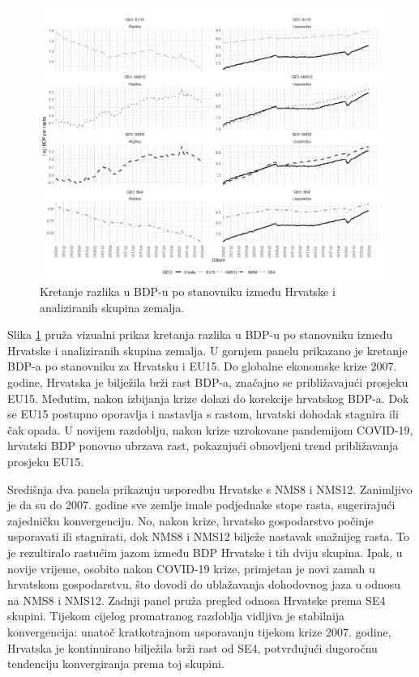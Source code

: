 \documentclass{crebsshr}
\begin{document}
\begin{figure}[ht]
\centering
\includegraphics[width=\linewidth]{Rplot.png} %
\caption{Kretanje razlika u BDP-u po stanovniku između Hrvatske i analiziranih skupina zemalja.}
\label{fig:grafikon1}
\end{figure}

Slika \ref{fig:grafikon1} pruža vizualni prikaz kretanja razlika u BDP-u po stanovniku između Hrvatske i analiziranih skupina zemalja. U gornjem panelu prikazano je kretanje BDP-a po stanovniku za Hrvatsku i EU15. Do globalne ekonomske krize 2007. godine, Hrvatska je bilježila brži rast BDP-a, značajno se približavajući prosjeku EU15. Međutim, nakon izbijanja krize dolazi do korekcije hrvatskog BDP-a. Dok se EU15 postupno oporavlja i nastavlja s rastom, hrvatski dohodak stagnira ili čak opada. U novijem razdoblju, nakon krize uzrokovane pandemijom COVID-19, hrvatski BDP ponovno ubrzava rast, pokazujući obnovljeni trend približavanja prosjeku EU15.

Središnja dva panela prikazuju usporedbu Hrvatske s NMS8 i NMS12. Zanimljivo je da su do 2007. godine sve zemlje imale podjednake stope rasta, sugerirajući zajedničku konvergenciju. No, nakon krize, hrvatsko gospodarstvo počinje usporavati ili stagnirati, dok NMS8 i NMS12 bilježe nastavak snažnijeg rasta. To je rezultiralo rastućim jazom između BDP Hrvatske i tih dviju skupina. Ipak, u novije vrijeme, osobito nakon COVID-19 krize, primjetan je novi zamah u hrvatskom gospodarstvu, što dovodi do ublažavanja dohodovnog jaza u odnosu na NMS8 i NMS12. Zadnji panel pruža pregled odnosa Hrvatske prema SE4 skupini. Tijekom cijelog promatranog razdoblja vidljiva je stabilnija konvergencija: unatoč kratkotrajnom usporavanju tijekom krize 2007. godine, Hrvatska je kontinuirano bilježila brži rast od SE4, potvrđujući dugoročnu tendenciju konvergiranja prema toj skupini.
\end{document}
